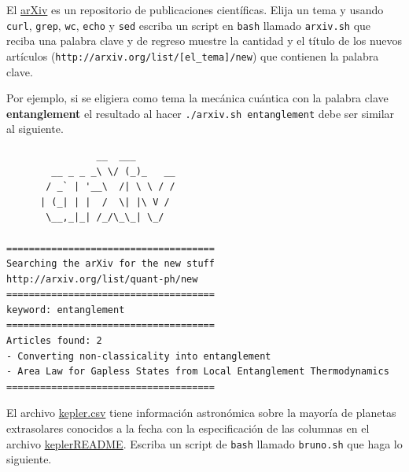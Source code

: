 \documentclass[11pt,letterpaper]{exam}
\begin{document}
\begin{questions}
 

El \href{http://en.wikipedia.org/wiki/ArXiv}{arXiv} es un repositorio de publicaciones científicas. Elija un tema y usando \verb+curl+, \verb+grep+, \verb+wc+, \verb+echo+ y \verb+sed+ escriba un script en \verb+bash+ llamado \verb+arxiv.sh+  que reciba una palabra clave y de regreso muestre la cantidad y el título de los nuevos artículos (\verb+http://arxiv.org/list/[el_tema]/new+) que contienen la palabra clave.

Por ejemplo, si se eligiera como tema la mecánica cuántica con la palabra clave \textbf{entanglement} el resultado al hacer \verb+./arxiv.sh entanglement+ debe ser similar al siguiente.

\begin{verbatim}
                __  ___       
        __ _ _ _\ \/ (_)_   __
       / _` | '__\  /| \ \ / /
      | (_| | |  /  \| |\ V / 
       \__,_|_| /_/\_\_| \_/  
                              
=====================================
Searching the arXiv for the new stuff
http://arxiv.org/list/quant-ph/new
=====================================
keyword: entanglement
=====================================
Articles found: 2
- Converting non-classicality into entanglement
- Area Law for Gapless States from Local Entanglement Thermodynamics
=====================================
\end{verbatim}


El archivo \href{https://raw.githubusercontent.com/ComputoCienciasUniandes/MetodosComputacionales/master/homework/2015-V/HW1/kepler.csv}{kepler.csv} tiene información astronómica sobre la mayoría de planetas extrasolares conocidos a la fecha con la especificación de las columnas en el archivo \href{https://raw.githubusercontent.com/ComputoCienciasUniandes/MetodosComputacionales/master/homework/2015-V/HW1/keplerREADME}{keplerREADME}. Escriba un script de \verb+bash+ llamado \verb+bruno.sh+ que haga lo siguiente.

\end{questions}
\end{document}
